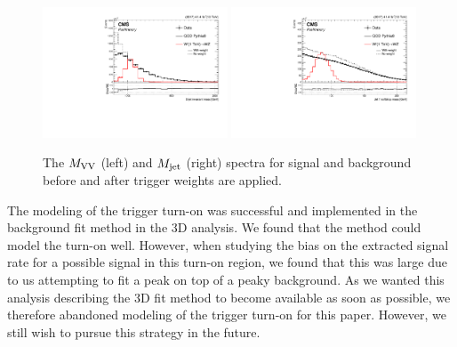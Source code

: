 \begin{figure}[h!]
\centering
\includegraphics[width=0.49\textwidth]{figures/analysis/search3/B2G-18-002/trigWeightCompare_looseSel_Dijet_invariant_mass.pdf}
\includegraphics[width=0.49\textwidth]{figures/analysis/search3/B2G-18-002/trigWeightCompare_looseSel_Jet_1_softdrop_mass.pdf}
\caption{The $M_{\rm VV}$ (left) and $M_{\rm jet}$ (right) spectra for signal and background before and after trigger weights are applied.}
\label{fig:triggerMCspectra}
\end{figure}
The modeling of the trigger turn-on was successful and implemented in the background fit method in the 3D analysis. We found that the method could model the turn-on well. However, when studying the bias on the extracted signal rate for a possible signal in this turn-on region, we found that this was large due to us attempting to fit a peak on top of a peaky background. As we wanted this analysis describing the 3D fit method to become available as soon as possible, we therefore abandoned modeling of the trigger turn-on for this paper. However, we still wish to pursue this strategy in the future.
\clearpage


